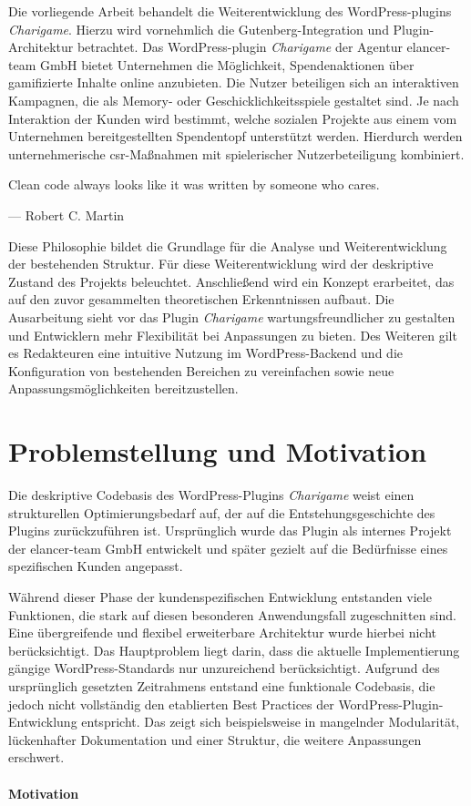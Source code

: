 Die vorliegende Arbeit behandelt die Weiterentwicklung des WordPress-\gls{plugin}s \textit{Charigame}.
Hierzu wird vornehmlich die Gutenberg-Integration und Plugin-Architektur betrachtet.
Das WordPress-\gls{plugin} \textit{Charigame} der Agentur elancer-team GmbH bietet Unternehmen die Möglichkeit, Spendenaktionen über gamifizierte Inhalte online anzubieten.
Die Nutzer beteiligen sich an interaktiven Kampagnen, die als Memory- oder Geschicklichkeitsspiele gestaltet sind.
Je nach Interaktion der Kunden wird bestimmt, welche sozialen Projekte aus einem vom Unternehmen bereitgestellten Spendentopf unterstützt werden.
Hierdurch werden unternehmerische \gls{csr}-Maßnahmen mit spielerischer Nutzerbeteiligung kombiniert.

\epigraph{ \glqq Clean code always looks like it was written by someone who cares.\grqq{}}{--- \textup{Robert C. Martin}}

Diese Philosophie bildet die Grundlage für die Analyse und Weiterentwicklung der bestehenden Struktur.
Für diese Weiterentwicklung wird der deskriptive Zustand des Projekts beleuchtet.
Anschließend wird ein Konzept erarbeitet, das auf den zuvor gesammelten theoretischen Erkenntnissen aufbaut.
Die Ausarbeitung sieht vor das Plugin \textit{Charigame} wartungsfreundlicher zu gestalten und Entwicklern mehr Flexibilität bei Anpassungen zu bieten.
Des Weiteren gilt es Redakteuren eine intuitive Nutzung im WordPress-Backend und die Konfiguration von bestehenden Bereichen zu vereinfachen sowie neue Anpassungsmöglichkeiten bereitzustellen.

\section{Problemstellung und Motivation}

Die deskriptive Codebasis des WordPress-Plugins \textit{Charigame} weist einen strukturellen Optimierungsbedarf auf, der auf die Entstehungsgeschichte des Plugins zurückzuführen ist.
Ursprünglich wurde das Plugin als internes Projekt der elancer-team GmbH entwickelt und später gezielt auf die Bedürfnisse eines spezifischen Kunden angepasst.

Während dieser Phase der kundenspezifischen Entwicklung entstanden viele Funktionen, die stark auf diesen besonderen Anwendungsfall zugeschnitten sind.
Eine übergreifende und flexibel erweiterbare Architektur wurde hierbei nicht berücksichtigt.
Das Hauptproblem liegt darin, dass die aktuelle Implementierung gängige WordPress-Standards nur unzureichend berücksichtigt.
Aufgrund des ursprünglich gesetzten Zeitrahmens entstand eine funktionale Codebasis, die jedoch nicht vollständig den etablierten Best Practices der WordPress-Plugin-Entwicklung entspricht.
Das zeigt sich beispielsweise in mangelnder Modularität, lückenhafter Dokumentation und einer Struktur, die weitere Anpassungen erschwert.
\\\\
\textbf{Motivation}

